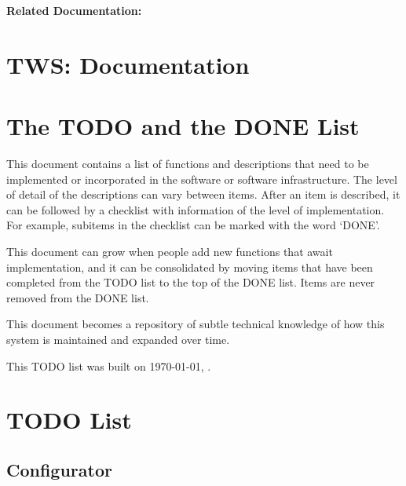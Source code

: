 \documentclass[12pt]{article}
\begin{document}
{\bf Related Documentation:}

\section*{TWS: Documentation}

\section{The TODO and the DONE List}

This document contains a list of functions and descriptions that need
to be implemented or incorporated in the software or software
infrastructure.  The level of detail of the descriptions can vary
between items.  After an item is described, it can be followed by a
checklist with information of the level of implementation.  For
example, subitems in the checklist can be marked with the word `DONE'.

This document can grow when people add new functions that await
implementation, and it can be consolidated by moving items that have
been completed from the TODO list to the top of the DONE list.  Items
are never removed from the DONE list.

This document becomes a repository of subtle technical knowledge of
how this system is maintained and expanded over time.

This TODO list was built on \today, \thistime.


\section{TODO List}

\subsection{Configurator}
\end{document}
